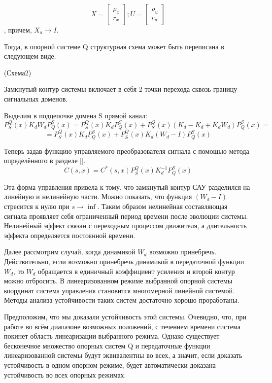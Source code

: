 \documentclass[a4paper]{article}
\begin{document}
\begin{equation}
X = \begin{bmatrix}\rho_x\\r_x\end{bmatrix};  
U = \begin{bmatrix}\rho_u\\r_u\end{bmatrix}
\end{equation},
причем, $X_a \rightarrow I$.

Тогда, в опорной системе Q структурная схема может быть переписана в следующем виде.

(Схема2)

Замкнутый контур системы включает в себя 2 точки перехода сквозь границу сигнальных доменов.

Выделим в подцепочке домена S прямой канал:
\begin{equation*} 
P_S^Q(x) K_d W_d P_Q^S(x) = P_S^Q(x) K_d P_Q^S(x) + P_S^Q(x) (K_d - K_d + K_d W_d) P_Q^S(x) = 
\end{equation*}
\begin{equation} 
=P_S^Q(x) K_d P_Q^S(x) + P_S^Q(x) K_d (W_d - I) P_Q^S(x) 
\end{equation}

Теперь задав функцию управляемого преобразователя сигнала с помощью метода определённого в разделе [].
\begin{equation} C(s,x) = C^*(s,x) P_S^Q(x) K_{d}^{-1} P_Q^S(x) \end{equation}

Эта форма управления привела к тому, что замкнутый контур САУ разделился на линейную и нелинейную части.
Можно показать, что функция $(W_d - I)$ стресится к нулю при $s \rightarrow \inf$. Таким образом нелинейная составляющая сигнала проявляет себя ограниченный период времени после эволюции системы. Нелинейный эффект связан с переходным процессом движителя, а длительность эффекта определяется постоянной времени.   

Далее рассмотрим случай, когда динамикой $W_d$ возможно принебречь. Действительно, если возможно принебречь динамикой в передаточной функции $W_{d}$, то $W_{d}$ обращается в единичный коэффициент усиления и второй контур можно отбросить. В линеаризованном режиме выбранной опорной системы координат система управления становится многомерной линейной системой. Методы анализа устойчивости таких систем достаточно хорошо проработаны.

Предположим, что мы доказали устойчивость этой системы. Очевидно, что, при работе во всём диапазоне возможных положений, с течением времени система покинет область линеаризации выбранного режима. Однако существует бесконечное множество опорных систем Q и передаточные функции линеаризованной системы будут эквивалентны во всех, а значит, если доказать устойчивость в одном опорном режиме, будет автоматически доказана устойчивость во всех опорных режимах. 
\end{document}
